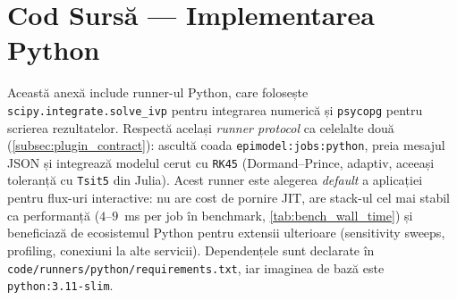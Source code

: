 \chapter{Cod Sursă — Implementarea Python}
\label{app:cod_python}

Această anexă include runner-ul Python, care folosește
\texttt{scipy.integrate.solve\_ivp} pentru integrarea numerică și
\texttt{psycopg} pentru scrierea rezultatelor. Respectă același
\emph{runner protocol} ca celelalte două (\cref{subsec:plugin_contract}):
ascultă coada \texttt{epimodel:jobs:python}, preia mesajul JSON și
integrează modelul cerut cu \texttt{RK45} (Dormand--Prince, adaptiv, aceeași
toleranță cu \texttt{Tsit5} din Julia). Acest runner este alegerea
\emph{default} a aplicației pentru flux-uri interactive: nu are cost de
pornire JIT, are stack-ul cel mai stabil ca performanță
($4$--$9$~ms per job în benchmark, \cref{tab:bench_wall_time}) și
beneficiază de ecosistemul Python pentru extensii ulterioare (sensitivity
sweeps, profiling, conexiuni la alte servicii). Dependențele sunt declarate
în \texttt{code/runners/python/requirements.txt}, iar imaginea de bază este
\texttt{python:3.11-slim}.


